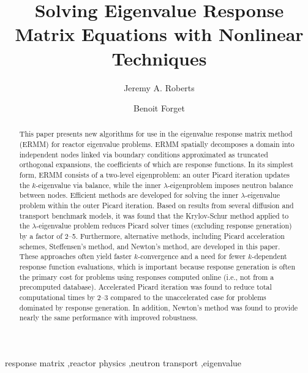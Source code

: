 \documentclass[final, 3p, 10pt]{elsarticle}
\begin{document}
\begin{frontmatter}

\title{Solving Eigenvalue Response Matrix Equations with 
       Nonlinear Techniques}


\author[label1]{Jeremy A. Roberts}
\author[label2]{Benoit Forget}
\address[label1]{Department of Mechanical and Nuclear Engineering,
                 Kansas State University, 3002 Rathbone Hall, Manhattan, KS 66506, USA}
\address[label2]{Department of Nuclear Science and Engineering, 
                 Massachusetts Institute of Technology,
                 77 Massachusetts Avenue, 24-107, Cambridge, MA 02139, USA}

\begin{abstract}

This paper presents new algorithms for use in the eigenvalue response matrix 
method (ERMM) for reactor eigenvalue problems.  ERMM spatially decomposes a
domain into independent nodes linked via boundary conditions approximated as 
truncated orthogonal expansions, the coefficients of which are response 
functions. In its simplest form, ERMM consists of a two-level eigenproblem: 
an outer Picard iteration updates the $k$-eigenvalue via balance,
while the inner $\lambda$-eigenproblem imposes neutron balance between nodes.  
Efficient methods are developed for solving the inner $\lambda$-eigenvalue 
problem within the outer Picard iteration. Based on results from  
several diffusion and transport benchmark models, it was found that 
the Krylov-Schur method applied to the $\lambda$-eigenvalue problem reduces 
Picard solver times (excluding response generation) by a factor of 2--5. 
Furthermore, alternative methods, including Picard acceleration schemes, 
Steffensen's method, and Newton's method, are developed in this paper.  
These approaches often yield faster $k$-convergence and a need for fewer 
$k$-dependent response function evaluations, which is important because 
response generation is often the primary cost for problems using responses 
computed online (i.e., not from a precomputed database). 
Accelerated Picard iteration was found to reduce total computational 
times by 2--3 compared to the unaccelerated case for problems dominated by 
response generation.  In addition, Newton's method was found to provide 
nearly the same performance with improved robustness.
\end{abstract}

\begin{keyword}

response matrix \sep reactor physics \sep neutron transport \sep eigenvalue
\end{keyword}

\end{frontmatter}






%
\end{document}
